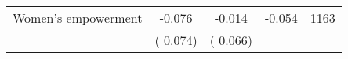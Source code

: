 \begin{tabular}{l*{4}{c}}
 Women's empowerment                       &             -0.076 &        -0.014            &             -0.054     & 1163                             \\  
                                       &          (       0.074)               &        (       0.066)                                &                                               &                                               \\      

\hline \end{tabular}                                                                                                              
